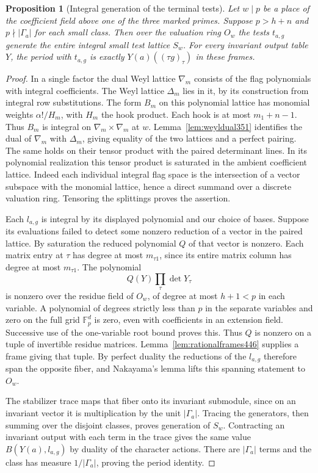 \documentclass[a4paper,11pt]{article}
\newtheorem{proposition}{Proposition}[section]
\theoremstyle{definition}
\theoremstyle{remark}
\numberwithin{equation}{section}
\begin{document}
\begin{proposition}[Integral generation of the terminal tests]\leavevmode
\label{prop:framegeneration446}
Let \(w\mid p\) be a place of the coefficient field above one of the
three marked primes. Suppose \(p>h+n\) and \(p\nmid|\Gamma_a|\) for
each small class. Then over the valuation ring \(O_w\) the tests
\(t_{a,g}\) generate the entire integral small test lattice \(S_w\).
For every invariant output table \(Y\), the period with \(t_{a,g}\)
is exactly \(Y(a)((\tau g)_\tau)\) in these frames.
\end{proposition}
\begin{proof}
In a single factor the dual Weyl lattice \(\nabla_m\) consists
of the flag polynomials with integral coefficients. The Weyl
lattice \(\Delta_m\) lies in it, by its construction from integral
row substitutions. The form \(B_m\) on this polynomial lattice
has monomial weights \(\alpha!/H_m\), with \(H_m\) the hook
product. Each hook is at most \(m_1+n-1\). Thus \(B_m\) is
integral on \(\nabla_m\times\nabla_m\) at \(w\).
Lemma~\ref{lem:weyldual351} identifies the dual of \(\nabla_m\)
with \(\Delta_m\), giving equality of the two lattices and a
perfect pairing. The same holds on their tensor product with the
paired determinant lines. In its polynomial realization this
tensor product is saturated in the ambient coefficient lattice.
Indeed each individual integral flag space is the intersection of
a vector subspace with the monomial lattice, hence a direct summand
over a discrete valuation ring. Tensoring the splittings proves
the assertion.

Each \(l_{a,g}\) is integral by its displayed polynomial and our
choice of bases. Suppose its evaluations failed to detect some
nonzero reduction of a vector in the paired lattice. By saturation
the reduced polynomial \(Q\) of that vector is nonzero. Each matrix
entry at \(\tau\) has degree at most \(m_{\tau1}\), since its entire
matrix column has degree at most \(m_{\tau1}\). The polynomial
\[
                    Q(Y)\prod_\tau \det Y_\tau
\]
is nonzero over the residue field of \(O_w\), of degree at most
\(h+1<p\) in each variable. A polynomial of degrees strictly less
than \(p\) in the separate variables and zero on the full grid
\(\mathbb F_p^d\) is zero, even with coefficients in an extension
field. Successive use of the one-variable root bound proves this.
Thus \(Q\) is nonzero on a tuple of invertible residue matrices.
Lemma~\ref{lem:rationalframes446} supplies a frame giving that tuple.
By perfect duality the reductions of the \(l_{a,g}\) therefore span
the opposite fiber, and Nakayama's lemma lifts this spanning
statement to \(O_w\).

The stabilizer trace maps that fiber onto its invariant submodule,
since on an invariant vector it is multiplication by the unit
\(|\Gamma_a|\). Tracing the generators, then summing over the
disjoint classes, proves generation of \(S_w\). Contracting an
invariant output with each term in the trace gives the same
value \(B(Y(a),l_{a,g})\) by duality of the character actions.
There are \(|\Gamma_a|\) terms and the class has measure
\(1/|\Gamma_a|\), proving the period identity.
\end{proof}
\end{document}
